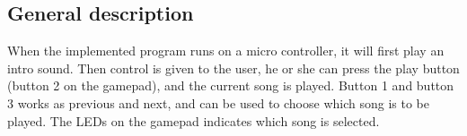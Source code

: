 \subsection{General description}

When the implemented program runs on a micro controller, it will first play an intro sound.
Then control is given to the user, he or she can press the play button (button 2 on the gamepad), and the current song is played.
Button 1 and button 3 works as previous and next, and can be used to choose which song is to be played.
The LEDs on the gamepad indicates which song is selected.
